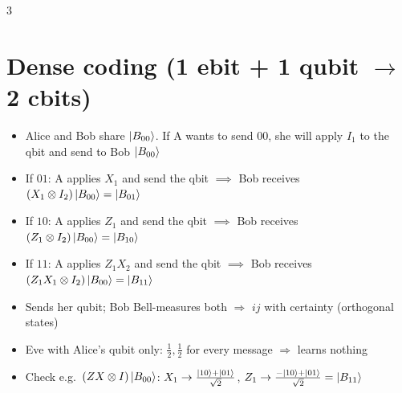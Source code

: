 \documentclass[10pt]{article}
\newcommand{\B}[1]{\ket{B_{#1}}}
\begin{document}
\begin{multicols*}{3}
\section{Dense coding (1 ebit + 1 qubit $\to$ 2 cbits)}
\begin{itemize}
  \item Alice and Bob share $\B{00}$. If A wants to send $00$, she will apply $I_1$ to the qbit and send to Bob $\ket{B_{00}}$
  \item If $01$: A applies $X_1$ and send the qbit $\implies$ Bob receives $\left(X_1 \otimes I_2\right)\ket{B_{00}} = \ket{B_{01}}$
  \item If $10$: A applies $Z_1$ and send the qbit $\implies$ Bob receives $\left(Z_1 \otimes I_2\right)\ket{B_{00}} = \ket{B_{10}}$
  \item If $11$: A applies $Z_1X_2$ and send the qbit $\implies$ Bob receives $\left(Z_1X_1 \otimes I_2\right)\ket{B_{00}} = \ket{B_{11}}$
  \item Sends her qubit; Bob Bell-measures both $\Rightarrow$ $ij$ with certainty (orthogonal states)
  \item Eve with Alice's qubit only: $\tfrac12,\tfrac12$ for every message $\Rightarrow$ learns nothing
  \item Check e.g.\ $(Z X\otimes I)\B{00}$: $X_1\to\tfrac{\ket{10}+\ket{01}}{\sqrt2}$, $Z_1\to\tfrac{-\ket{10}+\ket{01}}{\sqrt2}=\B{11}$
\end{itemize}


\end{multicols*}
\end{document}
